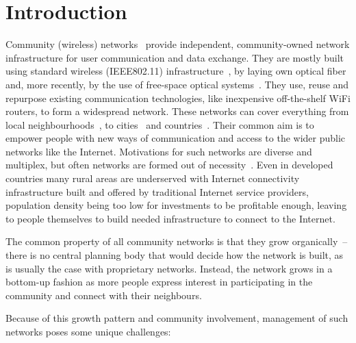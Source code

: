 \documentclass[5p,sort&compress]{elsarticle}
\begin{document}
\section{Introduction}

Community (wireless) networks~\cite{Bruno_2005,Frangoudis_2011} provide independent, community-owned network infrastructure for user communication and data exchange.
They are mostly built using standard wireless (IEEE802.11) infrastructure~\cite{Akyildiz_2005}, by laying own optical fiber and, more recently, by the use of free-space optical systems~\cite{Mustafa_2013}.
They use, reuse and repurpose existing communication technologies, like inexpensive off-the-shelf WiFi routers, to form a widespread network.
These networks can cover everything from local neighbourhoods~\cite{RedHook_2013}, to cities~\cite{AWMN} and countries~\cite{wlanslovenija_2009, guifi_2003, Funkfeuer_2003, Freifunk_2003}.
Their common aim is to empower people with new ways of communication and access to the wider public networks like the Internet.
Motivations for such networks are diverse and multiplex, but often networks are formed out of necessity~\cite{WNDW_2013}.
Even in developed countries many rural areas are underserved with Internet connectivity infrastructure built and offered by traditional Internet service providers, population density being too low for investments to be profitable enough, leaving to people themselves to build needed infrastructure to connect to the Internet.

The common property of all community networks is that they grow organically~-- there is no central planning body that would decide how the network is built, as is usually the case with proprietary networks.
Instead, the network grows in a bottom-up fashion as more people express interest in participating in the community and connect with their neighbours.

Because of this growth pattern and community involvement, management of such networks poses some unique challenges:
\end{document}
